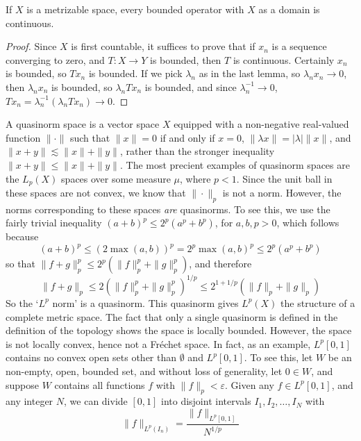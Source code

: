 \begin{theorem}
    If $X$ is a metrizable space, every bounded operator with $X$ as a domain is continuous.
\end{theorem}
\begin{proof}
    Since $X$ is first countable, it suffices to prove that if $x_n$ is a sequence converging to zero, and $T: X \to Y$ is bounded, then $T$ is continuous. Certainly $x_n$ is bounded, so $Tx_n$ is bounded. If we pick $\lambda_n$ as in the last lemma, so $\lambda_n x_n \to 0$, then $\lambda_n x_n$ is bounded, so $\lambda_n Tx_n$ is bounded, and since $\lambda_n^{-1} \to 0$, $Tx_n = \lambda_n^{-1} (\lambda_n Tx_n) \to 0$.
\end{proof}

\begin{example}
    A quasinorm space is a vector space $X$ equipped with a non-negative real-valued function $\| \cdot \|$ such that $\| x \| = 0$ if and only if $x = 0$, $\| \lambda x \| = |\lambda| \| x \|$, and $\| x + y \| \lesssim \|x\| + \|y\|$, rather than the stronger inequality $\| x + y \| \leq \| x \| + \| y \|$. The most precient examples of quasinorm spaces are the $L_p(X)$ spaces over some measure $\mu$, where $p < 1$. Since the unit ball in these spaces are not convex, we know that $\| \cdot \|_p$ is not a norm. However, the norms corresponding to these spaces {\it are} quasinorms. To see this, we use the fairly trivial inequality $(a + b)^p \leq 2^p(a^p + b^p)$, for $a,b,p > 0$, which follows because
    \[ (a + b)^p \leq (2 \max(a,b))^p = 2^p \max(a,b)^p \leq 2^p(a^p + b^p) \]
    so that $\| f + g \|_p^p \leq 2^p ( \| f \|_p^p + \| g \|_p^p )$, and therefore
    \[ \| f + g \|_p \leq 2 ( \| f \|_p^p + \| g \|_p^p )^{1/p} \leq 2^{1 + 1/p} ( \| f \|_p + \| g \|_p ) \]
    So the `$L^p$ norm' is a quasinorm. This quasinorm gives $L^p(X)$ the structure of a complete metric space. The fact that only a single quasinorm is defined in the definition of the topology shows the space is locally bounded.  However, the space is not locally convex, hence not a Fr\'{e}chet space. In fact, as an example, $L^p[0,1]$ contains no convex open sets other than $\emptyset$ and $L^p[0,1]$. To see this, let $W$ be an non-empty, open, bounded set, and without loss of generality, let $0 \in W$, and suppose $W$ contains all functions $f$ with $\| f \|_p < \varepsilon$. Given any $f \in L^p[0,1]$, and any integer $N$, we can divide $[0,1]$ into disjoint intervals $I_1, I_2, \dots, I_N$ with
    \[ \| f \|_{L^p(I_n)} = \frac{\| f \|_{L^p[0,1]}}{N^{1/p}} \]

\end{example}
